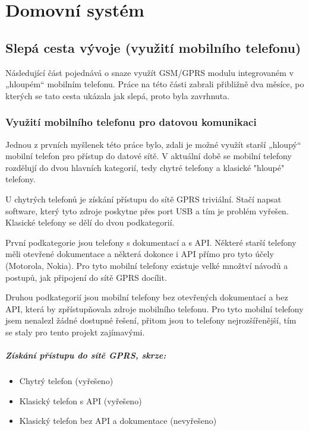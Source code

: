 \documentclass[FM,DP]{tulthesis}  %
\begin{document}
\chapter{Domovní systém}

\section{Slepá cesta vývoje (využití mobilního telefonu)}
Následující část pojednává o snaze využít GSM/GPRS modulu integrovaném v „hloupém“ mobilním telefonu. Práce na této části zabrali přibližně dva měsíce, po kterých se tato cesta ukázala jak slepá, proto byla zavrhnuta.

\subsection{Využití mobilního telefonu pro datovou komunikaci}
Jednou z prvních myšlenek této práce bylo, zdali je možné využít starší „hloupý“ mobilní telefon pro přístup do datové sítě. V aktuální době se mobilní telefony rozdělují do dvou hlavních kategorií, tedy chytré telefony a klasické "hloupé" telefony.

U chytrých telefonů je získání přístupu do sítě GPRS triviální. Stačí napsat software, který tyto zdroje poskytne přes port USB a tím je problém vyřešen. Klasické telefony se dělí do dvou podkategorií. 

První podkategorie jsou telefony s dokumentací a s API. Některé starší telefony měli otevřené dokumentace a některá dokonce i API přímo pro tyto účely (Motorola, Nokia). Pro tyto mobilní telefony existuje velké množtví návodů a postupů, jak připojení do sítě GPRS docílit. 

Druhou podkategorií jsou mobilní telefony bez otevřených dokumentací a bez API, která by zpřístupňovala zdroje mobilního telefonu. Pro tyto mobilní telefony jsem nenalezl žádné dostupné řešení, přitom jsou to telefony nejrozšířenější, tím se staly pro tento projekt zajímavými.

\paragraph{Získání přístupu do sítě GPRS, skrze:}
\begin{itemize}
\item Chytrý telefon (vyřešeno)
\item Klasický telefon s API (vyřešeno)
\item Klasický telefon bez API a dokumentace (nevyřešeno)
\end{itemize} 
\end{document}
